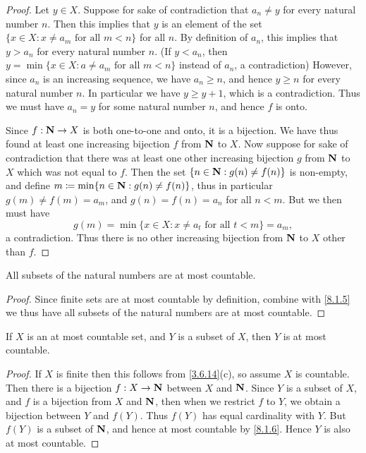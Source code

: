\begin{proof}
  Let \(y \in X\).
  Suppose for sake of contradiction that \(a_n \neq y\) for every natural number \(n\).
  Then this implies that \(y\) is an element of the set \(\{x \in X : x \neq a_m \text{ for all } m < n\}\) for all \(n\).
  By definition of \(a_n\), this implies that \(y > a_n\) for every natural number \(n\).
  (If \(y < a_n\), then \(y = \min\{x \in X : a \neq a_m \text{ for all } m < n\}\) instead of \(a_n\), a contradiction)
  However, since \(a_n\) is an increasing sequence, we have \(a_n \geq n\), and hence \(y \geq n\) for every natural number \(n\).
  In particular we have \(y \geq y + 1\), which is a contradiction.
  Thus we must have \(a_n = y\) for some natural number \(n\), and hence \(f\) is onto.

  Since \(f : \mathbf{N} \to X\) is both one-to-one and onto, it is a bijection.
  We have thus found at least one increasing bijection \(f\) from \(\mathbf{N}\) to \(X\).
  Now suppose for sake of contradiction that there was at least one other increasing bijection \(g\) from \(\mathbf{N}\) to \(X\) which was not equal to \(f\).
  Then the set \(\{n \in \mathbf{N} : g(n) \neq f(n)\}\) is non-empty, and define \(m \coloneqq \min\{n \in \mathbf{N} : g(n) \neq f(n)\}\), thus in particular \(g(m) \neq f(m) = a_m\), and \(g(n) = f(n) = a_n\) for all \(n < m\).
  But we then must have
  \[
    g(m) = \min\{x \in X : x \neq a_t \text{ for all } t < m\} = a_m,
  \]
  a contradiction.
  Thus there is no other increasing bijection from \(\mathbf{N}\) to \(X\) other than \(f\).
\end{proof}

\begin{corollary}\label{8.1.6}
  All subsets of the natural numbers are at most countable.
\end{corollary}

\begin{proof}
  Since finite sets are at most countable by definition, combine with \cref{8.1.5} we thus have all subsets of the natural numbers are at most countable.
\end{proof}

\begin{corollary}\label{8.1.7}
  If \(X\) is an at most countable set, and \(Y\) is a subset of \(X\), then \(Y\) is at most countable.
\end{corollary}

\begin{proof}
  If \(X\) is finite then this follows from \cref{3.6.14}(c), so assume \(X\) is countable.
  Then there is a bijection \(f : X \to \mathbf{N}\) between \(X\) and \(\mathbf{N}\).
  Since \(Y\) is a subset of \(X\), and \(f\) is a bijection from \(X\) and \(\mathbf{N}\), then when we restrict \(f\) to \(Y\), we obtain a bijection between \(Y\) and \(f(Y)\).
  Thus \(f(Y)\) has equal cardinality with \(Y\).
  But \(f(Y)\) is a subset of \(\mathbf{N}\), and hence at most countable by \cref{8.1.6}.
  Hence \(Y\) is also at most countable.
\end{proof}


